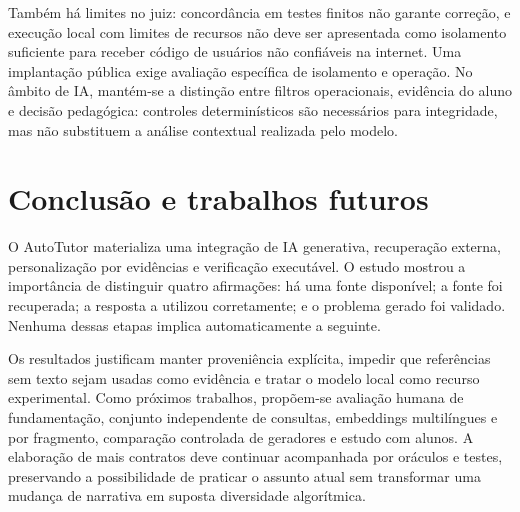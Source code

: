 \documentclass[12pt]{article}
\begin{document}
Também há limites no juiz: concordância em testes finitos não garante correção, e execução local com limites de recursos não deve ser apresentada como isolamento suficiente para receber código de usuários não confiáveis na internet. Uma implantação pública exige avaliação específica de isolamento e operação. No âmbito de IA, mantém-se a distinção entre filtros operacionais, evidência do aluno e decisão pedagógica: controles determinísticos são necessários para integridade, mas não substituem a análise contextual realizada pelo modelo.

\section{Conclusão e trabalhos futuros}
O AutoTutor materializa uma integração de IA generativa, recuperação externa, personalização por evidências e verificação executável. O estudo mostrou a importância de distinguir quatro afirmações: há uma fonte disponível; a fonte foi recuperada; a resposta a utilizou corretamente; e o problema gerado foi validado. Nenhuma dessas etapas implica automaticamente a seguinte.

Os resultados justificam manter proveniência explícita, impedir que referências sem texto sejam usadas como evidência e tratar o modelo local como recurso experimental. Como próximos trabalhos, propõem-se avaliação humana de fundamentação, conjunto independente de consultas, embeddings multilíngues e por fragmento, comparação controlada de geradores e estudo com alunos. A elaboração de mais contratos deve continuar acompanhada por oráculos e testes, preservando a possibilidade de praticar o assunto atual sem transformar uma mudança de narrativa em suposta diversidade algorítmica.



\end{document}
